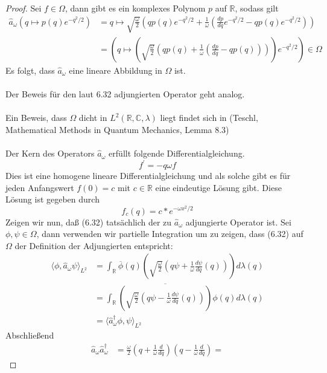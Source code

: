 \documentclass[11pt,a4paper,leqno]{report}
\numberwithin{equation}{chapter}
\begin{document}
\begin{proof}
	Sei $f\in\Omega$, dann gibt es ein komplexes Polynom $p$ auf $\mathbb{R}$, sodass gilt
	\begin{align*}
		\hat{a}_\omega (q\mapsto p(q)e^{-q^2/2}) &= q \mapsto \sqrt{\frac{\omega}{2}}(q p(q)e^{-q^2/2} +  \frac{1}{\omega}(\frac{dp}{dq}e^{-q^2/2} - q p(q)e^{-q^2/2}))\\&=(q \mapsto (\sqrt{\frac{\omega}{2}}(q p(q) +  \frac{1}{\omega}(\frac{dp}{dq} - q p(q))))e^{-q^2/2})\in \Omega
	\end{align*}
Es folgt, dass $\hat{a}_\omega$ eine lineare Abbildung in $\Omega$ ist. \\
\\
Der Beweis f\"ur den laut 6.32 adjungierten Operator geht analog.\\
\\
Ein Beweis, dass $\Omega$ dicht in $L^2(\mathbb{R}, \mathbb{C},\lambda)$ liegt findet sich in (Teschl, Mathematical Methods in Quantum Mechanics, Lemma 8.3)\\
\\
Der Kern des Operators $\hat{a}_\omega$ erf\"ullt folgende Differentialgleichung.
\begin{equation*}
	f^\prime=-q\omega f
\end{equation*}
Dies ist eine homogene lineare Differentialgleichung und als solche gibt es f\"ur jeden Anfangswert $f(0)=c$ mit $c\in \mathbb{R}$ eine eindeutige L\"osung gibt. Diese L\"osung ist gegeben durch
\begin{equation*}
	f_c(q) = c * e^{-\omega x^2 / 2}
\end{equation*}
Zeigen wir nun, da\ss{} (6.32) tats\"achlich der zu $\hat{a}_\omega$ adjungierte Operator ist.
Sei $\phi, \psi \in \Omega$, dann verwenden wir partielle Integration um zu zeigen, dass (6.32) auf $\Omega$ der Definition der Adjungierten entspricht:
\begin{align*}
	\langle \phi, \hat{a}_\omega\psi\rangle_{L^2} &= 
	\int_\mathbb{R} \overline{\phi}(q)( \sqrt{\frac{\omega}{2}}(q\psi +  \frac{1}{\omega}\frac{d\psi}{dq}(q)))d\lambda(q)\\&=
	\int_\mathbb{R} \overline{( \sqrt{\frac{\omega}{2}}(q\psi -  \frac{1}{\omega}\frac{d\psi}{dq}(q)))}\phi(q) d\lambda(q)\\&=\langle \hat{a}^\dagger_\omega\phi, \psi\rangle_{L^2}
\end{align*}
Abschlie\ss{}end
\begin{align*}
	\hat{a}_\omega\hat{a}_\omega^\dagger &= 
	\frac{\omega}{2}(q + \frac{1}{\omega}\frac{d}{dq})(q - \frac{1}{\omega}\frac{d}{dq})=

\end{align*}
\end{proof}
\end{document}

